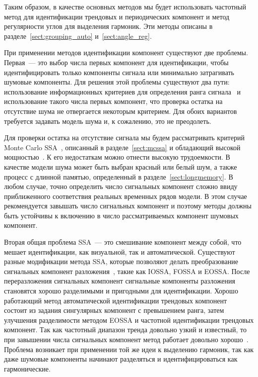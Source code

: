 \documentclass[specialist,
substylefile = spbu_report.rtx,
subf,12pt]{disser}
\theoremstyle{definition}
\begin{document}
Таким образом, в качестве основных методов мы будет использовать частотный метод для идентификации трендовых и периодических компонент и метод регулярности углов для выделения гармоник. Эти методы описаны в разделе~\ref{sect:grouping_auto} и~\ref{sect:angle_reg}.

При применении методов идентификации компонент существуют две проблемы. Первая~--- это выбор числа первых компонент для идентификации, чтобы идентифицировать только компоненты сигнала или минимально затрагивать шумовые компоненты. Для решения этой проблемы существуют два пути: использование информационных критериев для определения ранга сигнала~\cite{GolyandinaZvonarev2024} и использование такого числа первых компонент, что проверка остатка на отсутствие шума не отвергается некоторым критерием. Для обоих вариантов требуется задавать модель шума и, к сожалению, это не преодолеть.

Для проверки остатка на отсутствие сигнала мы будем рассматривать критерий Monte Carlo SSA~\cite{Allen1996}, описанный в разделе~\ref{sect:mcssa} и обладающий высокой мощностью~\cite{Poteshkin2024}. К его недостаткам можно отнести высокую трудоемкости. В качестве модели шума может быть выбран красный или белый шум, а также процесс с длинной памятью, определенный в разделе~\ref{sect:longmemory}. В любом случае, точно определить число сигнальных компонент сложно ввиду приближенного соответствия реальных временных рядов модели. В этом случае рекомендуется завышать число сигнальных компонент и поэтому методы должны быть устойчивы к включению в число рассматриваемых компонент шумовых компонент.

Вторая общая проблема SSA~--- это смешивание компонент между собой, что мешает идентификации, как визуальной, так и автоматической. Существуют разные модификации метода SSA, которые позволяют делать преобразование сигнальных компонент разложения~\cite{GolyandinaShlemov15, Shlemov2017, autoSSA}, такие как IOSSA, FOSSA и EOSSA. После переразложения сигнальных компонент сигнальные компоненты разложения становятся хорошо разделимыми и пригодными для идентификации. Хорошо работающий метод автоматической идентификации трендовых компонент~\cite{autoSSA} состоит из задания сингулярных компонент с превышением ранга, затем улучшения разделимости методом EOSSA и частотной идентификации трендовых компонент. Так как частотный диапазон тренда довольно узкий и известный, то при завышении числа сигнальных компонент метод работает довольно хорошо~\cite{autoSSA}. Проблема возникает при применении той же идеи к выделению гармоник, так как даже шумовые компоненты начинают разделяться и идентифицироваться как гармонические.
\end{document}
